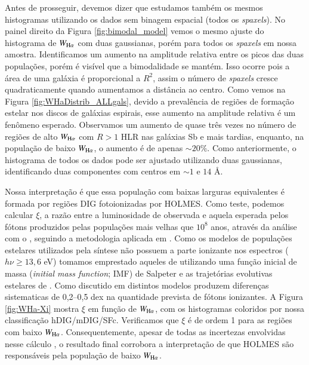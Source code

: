 
Antes de prosseguir, devemos dizer que estudamos também os mesmos histogramas utilizando os dados sem binagem espacial (todos os {\em spaxels}). No painel direito da Figura \ref{fig:bimodal_model} vemos o mesmo ajuste do histograma de $W_{\Ha}$ com duas gaussianas, porém para todos os {\em spaxels} em nossa amostra. Identificamos um aumento na amplitude relativa entre os picos das duas populações, porém é visível que a bimodalidade se mantém. Isso ocorre pois a área de uma galáxia é proporcional a $R^2$, assim o número de {\em spaxels} cresce quadraticamente quando aumentamos a distância ao centro. Como vemos na Figura \ref{fig:WHaDistrib_ALLgals}, devido a prevalência de regiões de formação estelar nos discos de galáxias espirais, esse aumento na amplitude relativa é um fenômeno esperado. Observamos um aumento de quase três vezes no número de regiões de alto $W_{\Ha}$ com $R > 1$ HLR nas galáxias Sb e mais tardias, enquanto, na população de baixo $W_{\Ha}$, o aumento é de apenas $\sim 20\%$. Como anteriormente, o histograma de todos os dados pode ser ajustado utilizando duas gaussianas, identificando duas componentes com centros em $\sim 1$ e $14$ \AA.




Nossa interpretação é que essa população com baixas larguras equivalentes é formada por regiões DIG fotoionizadas por HOLMES. Como teste, podemos calcular $\xi$, a razão entre a luminosidade de \Ha observada e aquela esperada pelos fótons produzidos pelas populações mais velhas que $10^8$ anos, através da análise com o \starlight, seguindo a metodologia aplicada em \citet{CidFernandes.etal.2011a}. Como os modelos de populações estelares utilizados pela síntese \citep{Gonzalezdelgado2005, Vazdekis2010} não possuem a parte ionizante nos espectros ($h\nu \ge 13,6$ eV) tomamos emprestado aqueles de \citet{Bruzual.Charlot.2003} utilizando uma função inicial de massa ({\em initial mass function}; IMF) de Salpeter e as trajetórias evolutivas estelares de \citet{Girardi2000}. Como discutido em \citet{CidFernandes.etal.2011a} distintos modelos produzem diferenças sistematicas de 0,2--0,5 dex na quantidade  prevista de fótons ionizantes. A Figura \ref{fig:WHa-Xi} mostra $\xi$ em função de $W_{\Ha}$, com os histogramas coloridos por nossa classificação hDIG/mDIG/SFc. Verificamos que $\xi$ é de ordem 1 para as regiões com baixo $W_{\Ha}$. Consequentemente, apesar de todas as incertezas envolvidas nesse cálculo \citep{CidFernandes.etal.2011a, Belfiore.etal.2016, Morisset.etal.2016}, o resultado final corrobora a interpretação de que HOLMES são responsáveis pela população de baixo $W_{\Ha}$.

